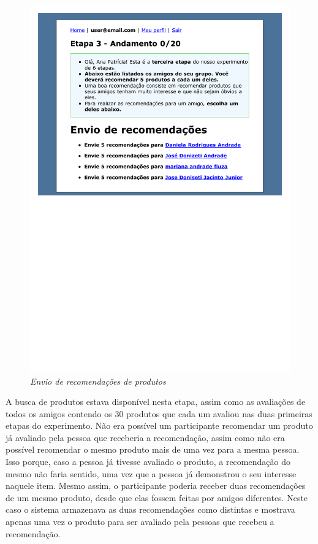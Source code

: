 \begin{figure}
  \centering
  \includegraphics[width=\textwidth]{imagens/stage-3}
  \caption{\it Envio de recomendações de produtos}
  \label{fig:stage-3}
\end{figure}

A busca de produtos estava disponível nesta etapa, assim como as avaliações de todos os amigos contendo os 30 produtos que cada um avaliou nas duas primeiras etapas do experimento. Não era possível um participante recomendar um produto já avaliado pela pessoa que receberia a recomendação, assim como não era possível recomendar o mesmo produto mais de uma vez para a mesma pessoa. Isso porque, caso a pessoa já tivesse avaliado o produto, a recomendação do mesmo não faria sentido, uma vez que a pessoa já demonstrou o seu interesse naquele item. Mesmo assim, o participante poderia receber duas recomendações de um mesmo produto, desde que elas fossem feitas por amigos diferentes. Neste caso o sistema armazenava as duas recomendações como distintas e mostrava apenas uma vez o produto para ser avaliado pela pessoas que recebeu a recomendação.

